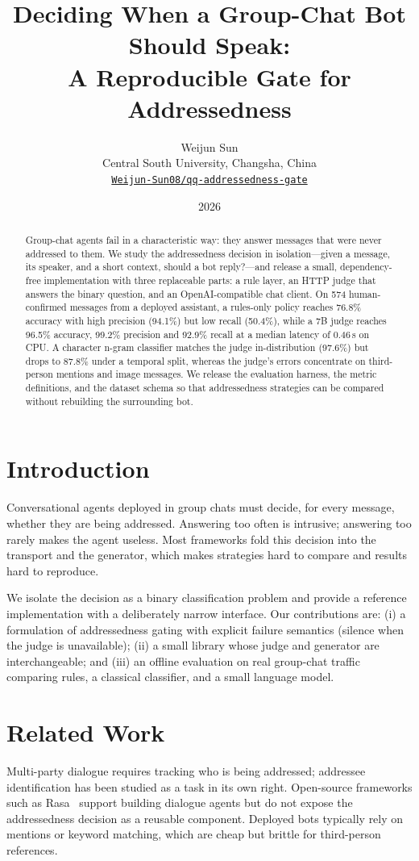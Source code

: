 ﻿\documentclass[11pt]{article}
\title{Deciding When a Group-Chat Bot Should Speak:\\
A Reproducible Gate for Addressedness}
\author{Weijun Sun\\
Central South University, Changsha, China\\
\href{https://github.com/Weijun-Sun08/qq-addressedness-gate}{\texttt{Weijun-Sun08/qq-addressedness-gate}}}
\date{2026}
\begin{document}
\maketitle

\begin{abstract}
Group-chat agents fail in a characteristic way: they answer messages that were never addressed to them.
We study the addressedness decision in isolation---given a message, its speaker, and a short context, should a bot reply?---and release a small, dependency-free implementation with three replaceable parts: a rule layer, an HTTP judge that answers the binary question, and an OpenAI-compatible chat client.
On 574 human-confirmed messages from a deployed assistant, a rules-only policy reaches 76.8\% accuracy with high precision (94.1\%) but low recall (50.4\%), while a 7B judge reaches 96.5\% accuracy, 99.2\% precision and 92.9\% recall at a median latency of 0.46\,s on CPU.
A character n-gram classifier matches the judge in-distribution (97.6\%) but drops to 87.8\% under a temporal split, whereas the judge's errors concentrate on third-person mentions and image messages.
We release the evaluation harness, the metric definitions, and the dataset schema so that addressedness strategies can be compared without rebuilding the surrounding bot.
\end{abstract}

\section{Introduction}
Conversational agents deployed in group chats must decide, for every message, whether they are being addressed.
Answering too often is intrusive; answering too rarely makes the agent useless.
Most frameworks fold this decision into the transport and the generator, which makes strategies hard to compare and results hard to reproduce.

We isolate the decision as a binary classification problem and provide a reference implementation with a deliberately narrow interface.
Our contributions are:
(i) a formulation of addressedness gating with explicit failure semantics (silence when the judge is unavailable);
(ii) a small library whose judge and generator are interchangeable; and
(iii) an offline evaluation on real group-chat traffic comparing rules, a classical classifier, and a small language model.

\section{Related Work}
Multi-party dialogue requires tracking who is being addressed; addressee identification has been studied as a task in its own right.
Open-source frameworks such as Rasa~\citep{rasa2017} support building dialogue agents but do not expose the addressedness decision as a reusable component.
Deployed bots typically rely on mentions or keyword matching, which are cheap but brittle for third-person references.
\end{document}
